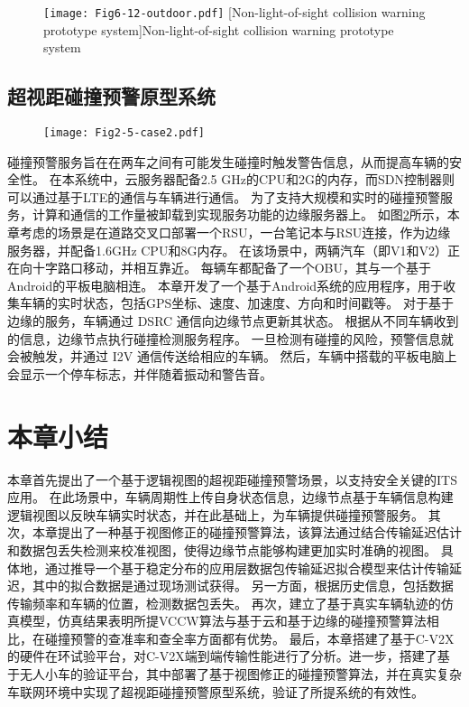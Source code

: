 \begin{figure}[h]
\centering
  \texttt{[image: Fig6-12-outdoor.pdf]}
  [Non-light-of-sight collision warning prototype system]{Non-light-of-sight collision warning prototype system}
  \label{fig 6-12}
\end{figure}

\subsection{超视距碰撞预警原型系统}

\begin{figure}[h] 
	\centering
	\texttt{[image: Fig2-5-case2.pdf]}
	\label{fig 2-5}
\end{figure}

碰撞预警服务旨在在两车之间有可能发生碰撞时触发警告信息，从而提高车辆的安全性。
在本系统中，云服务器配备2.5 GHz的CPU和2G的内存，而SDN控制器则可以通过基于LTE的通信与车辆进行通信。
为了支持大规模和实时的碰撞预警服务，计算和通信的工作量被卸载到实现服务功能的边缘服务器上。
如图\ref{fig 2-5}所示，本章考虑的场景是在道路交叉口部署一个RSU，一台笔记本与RSU连接，作为边缘服务器，并配备1.6GHz CPU和8G内存。
在该场景中，两辆汽车（即V1和V2）正在向十字路口移动，并相互靠近。
每辆车都配备了一个OBU，其与一个基于Android的平板电脑相连。
本章开发了一个基于Android系统的应用程序，用于收集车辆的实时状态，包括GPS坐标、速度、加速度、方向和时间戳等。
对于基于边缘的服务，车辆通过 DSRC 通信向边缘节点更新其状态。
根据从不同车辆收到的信息，边缘节点执行碰撞检测服务程序。
一旦检测有碰撞的风险，预警信息就会被触发，并通过 I2V 通信传送给相应的车辆。
然后，车辆中搭载的平板电脑上会显示一个停车标志，并伴随着振动和警告音。


\section{本章小结}\label{section 6-6}

本章首先提出了一个基于逻辑视图的超视距碰撞预警场景，以支持安全关键的ITS应用。
在此场景中，车辆周期性上传自身状态信息，边缘节点基于车辆信息构建逻辑视图以反映车辆实时状态，并在此基础上，为车辆提供碰撞预警服务。
其次，本章提出了一种基于视图修正的碰撞预警算法，该算法通过结合传输延迟估计和数据包丢失检测来校准视图，使得边缘节点能够构建更加实时准确的视图。
具体地，通过推导一个基于稳定分布的应用层数据包传输延迟拟合模型来估计传输延迟，其中的拟合数据是通过现场测试获得。
另一方面，根据历史信息，包括数据传输频率和车辆的位置，检测数据包丢失。
再次，建立了基于真实车辆轨迹的仿真模型，仿真结果表明所提VCCW算法与基于云和基于边缘的碰撞预警算法相比，在碰撞预警的查准率和查全率方面都有优势。
最后，本章搭建了基于C-V2X的硬件在环试验平台，对C-V2X端到端传输性能进行了分析。进一步，搭建了基于无人小车的验证平台，其中部署了基于视图修正的碰撞预警算法，并在真实复杂车联网环境中实现了超视距碰撞预警原型系统，验证了所提系统的有效性。